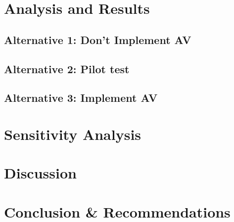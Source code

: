 \documentclass[11pt, letterpaper]{article}
\begin{document}
\section{Analysis and Results} \label{results}


\subsection{Alternative 1: Don't Implement AV}

\subsection{Alternative 2: Pilot test}

\subsection{Alternative 3: Implement AV}

\section{Sensitivity Analysis} \label{sensitivity}


\section{Discussion} \label{discussion}


\section{Conclusion \& Recommendations} \label{conclusion}

\end{document}
